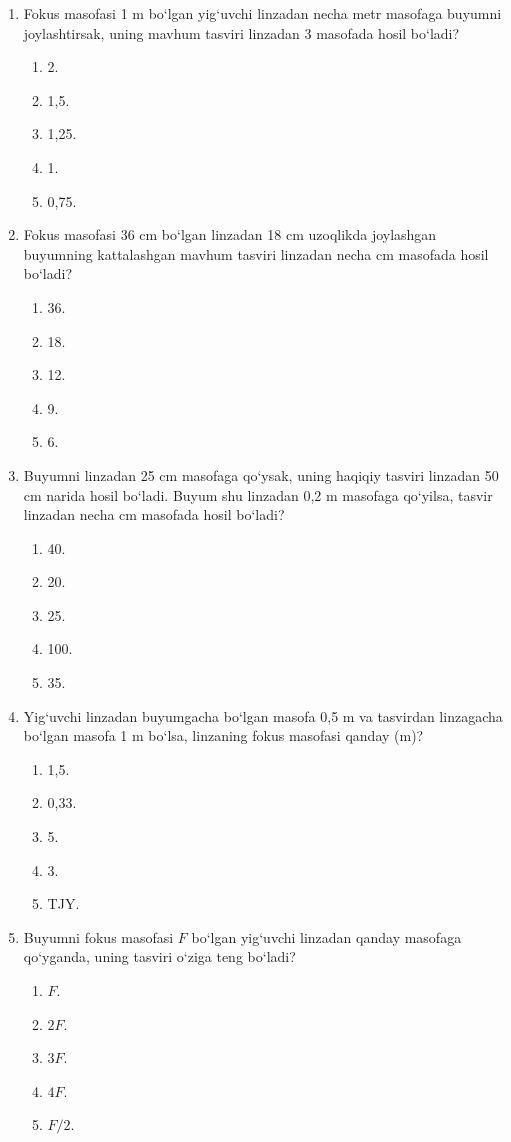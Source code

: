 \begin{enumerate}
\item Fokus masofasi 1 m bo‘lgan yig‘uvchi linzadan necha metr masofaga buyumni joylashtirsak, uning mavhum tasviri linzadan 3 masofada hosil bo‘ladi?
\begin{enumerate}[label=\Alph*)]
\item 2.
\item 1,5.
\item 1,25.
\item 1.
\item 0,75.
\end{enumerate}

\item Fokus masofasi 36 cm bo‘lgan linzadan 18 cm uzoqlikda joylashgan buyumning kattalashgan mavhum tasviri linzadan necha cm masofada hosil bo‘ladi?
\begin{enumerate}[label=\Alph*)]
\item 36.
\item 18.
\item 12.
\item 9.
\item 6.
\end{enumerate}

\item Buyumni linzadan 25 cm masofaga qo‘ysak, uning haqiqiy tasviri linzadan 50 cm narida hosil bo‘ladi. Buyum shu linzadan 0,2 m masofaga qo‘yilsa, tasvir linzadan necha cm masofada hosil bo‘ladi?
\begin{enumerate}[label=\Alph*)]
\item 40.
\item 20.
\item 25.
\item 100.
\item 35.
\end{enumerate}

\item Yig‘uvchi linzadan buyumgacha bo‘lgan masofa 0,5 m va tasvirdan linzagacha bo‘lgan masofa 1 m bo‘lsa, linzaning fokus masofasi qanday (m)?
\begin{enumerate}[label=\Alph*)]
\item 1,5.
\item 0,33.
\item 5.
\item 3.
\item TJY.
\end{enumerate}

\item Buyumni fokus masofasi $F$ bo‘lgan yig‘uvchi linzadan qanday masofaga qo‘yganda, uning tasviri o‘ziga teng bo‘ladi?
\begin{enumerate}[label=\Alph*)]
\item $F$.
\item $2F$.
\item $3F$.
\item $4F$.
\item $F/2$.
\end{enumerate}


\end{enumerate}
